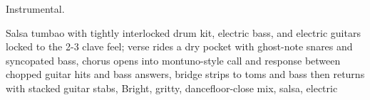 
\begin{notes}
Instrumental.
\end{notes}
\begin{prompt}
Salsa tumbao with tightly interlocked drum kit, electric bass, and electric guitars locked to the 2-3 clave feel; verse rides a dry pocket with ghost-note snares and syncopated bass, chorus opens into montuno-style call and response between chopped guitar hits and bass answers, bridge strips to toms and bass then returns with stacked guitar stabs, Bright, gritty, dancefloor-close mix, salsa, electric
\end{prompt}


